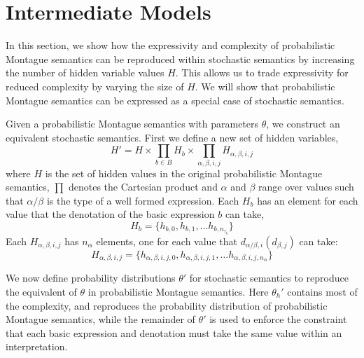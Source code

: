 \documentclass[manuscript]{clv2}
\begin{document}
\section{Intermediate Models}

In this section, we show how the expressivity and complexity of
probabilistic Montague semantics can be reproduced within stochastic
semantics by increasing the number of hidden variable values $H$. This
allows us to trade expressivity for reduced complexity by varying the
size of $H$. We will show that probabilistic Montague semantics can be
expressed as a special case of stochastic semantics.

Given a probabilistic Montague semantics with parameters $\theta$, we
construct an equivalent stochastic semantics. First we define a new
set of hidden variables,
$$H' = H \times \prod_{b\in B} H_b \times \prod_{\alpha,\beta,i,j}
H_{\alpha,\beta,i,j}$$ where $H$ is the set of hidden values in the
original probabilistic Montague semantics, $\prod$ denotes the
Cartesian product and $\alpha$ and $\beta$ range over values such that
$\alpha/\beta$ is the type of a well formed expression. Each $H_b$ has
an element for each value that the denotation of the basic expression
$b$ can take,
$$H_b = \{h_{b,0}, h_{b,1},\ldots h_{b, n_{\tau_b}}\}$$
Each $H_{\alpha,\beta,i,j}$ has $n_\alpha$ elements, one for each
value that $d_{\alpha/\beta,i}(d_{\beta,j})$ can take:
$$H_{\alpha,\beta,i,j} = \{h_{\alpha,\beta,i,j,0}, h_{\alpha,\beta,i,j,1},\ldots h_{\alpha,\beta,i,j,n_{\alpha}}\}$$

We now define probability distributions $\theta'$ for stochastic
semantics to reproduce the equivalent of $\theta$ in probabilistic
Montague semantics. Here $\theta_h'$ contains most of the complexity,
and reproduces the probability distribution of probabilistic Montague
semantics, while the remainder of $\theta'$ is used to enforce the
constraint that each basic expression and denotation must take the
same value within an interpretation.
\end{document}
